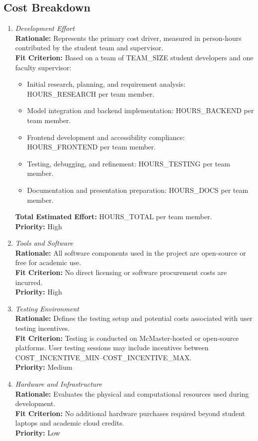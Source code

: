 \documentclass[12pt]{article}
\begin{document}
\subsection{Cost Breakdown}
\begin{enumerate}[label=C-CB \arabic*., wide=0pt, leftmargin=*]
\item \emph{Development Effort}\\[2mm] 
    {\bf Rationale:} Represents the primary cost driver, measured in person-hours contributed by the student team and supervisor.\\
    {\bf Fit Criterion:} Based on a team of TEAM\_SIZE student developers and one faculty supervisor:
    \begin{itemize}
        \item Initial research, planning, and requirement analysis: HOURS\_RESEARCH per team member.
        \item Model integration and backend implementation: HOURS\_BACKEND per team member.
        \item Frontend development and accessibility compliance: HOURS\_FRONTEND per team member.
        \item Testing, debugging, and refinement: HOURS\_TESTING per team member.
        \item Documentation and presentation preparation: HOURS\_DOCS per team member.
    \end{itemize}
    {\bf Total Estimated Effort:} HOURS\_TOTAL per team member.\\
    {\bf Priority:} High

\item \emph{Tools and Software}\\[2mm] 
    {\bf Rationale:} All software components used in the project are open-source or free for academic use.\\
    {\bf Fit Criterion:} No direct licensing or software procurement costs are incurred.\\
    {\bf Priority:} High

\item \emph{Testing Environment}\\[2mm] 
    {\bf Rationale:} Defines the testing setup and potential costs associated with user testing incentives.\\
    {\bf Fit Criterion:} Testing is conducted on McMaster-hosted or open-source platforms. User testing sessions may include incentives between COST\_INCENTIVE\_MIN–COST\_INCENTIVE\_MAX.\\
    {\bf Priority:} Medium

\item \emph{Hardware and Infrastructure}\\[2mm] 
    {\bf Rationale:} Evaluates the physical and computational resources used during development.\\
    {\bf Fit Criterion:} No additional hardware purchases required beyond student laptops and academic cloud credits.\\
    {\bf Priority:} Low
\end{enumerate}
\end{document}
